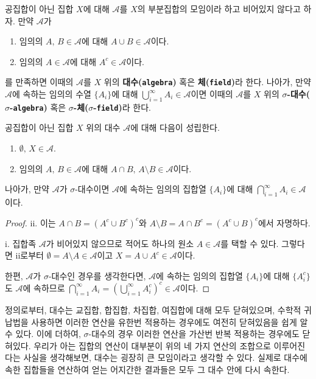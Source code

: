 \begin{definition}\label{def:algebra}
    공집합이 아닌 집합 $X$에 대해 $\mathcal{A}$를 $X$의 부분집합의 모임이라 하고 비어있지 않다고 하자. 만약 $\mathcal{A}$가
    \begin{enumerate}
        \item 임의의 $A,\,B\in\mathcal{A}$에 대해 $A\cup B\in\mathcal{A}$이다.
        \item 임의의 $A\in\mathcal{A}$에 대해 $A^c\in\mathcal{A}$이다.
    \end{enumerate}
    를 만족하면 이때의 $\mathcal{A}$를 $X$ 위의 \textbf{대수(\texttt{algebra})} 혹은 \textbf{체(\texttt{field})}라 한다. 나아가, 만약 $\mathcal{A}$에 속하는 임의의 수열 $\{A_i\}$에 대해 $\bigcup_{i=1}^\infty A_i\in\mathcal{A}$이면 이때의 $\mathcal{A}$를 $X$ 위의 \textbf{$\sigma$-대수($\sigma$-\texttt{algebra})} 혹은 \textbf{$\sigma$-체($\sigma$-\texttt{field})}라 한다.
\end{definition}

\begin{proposition}
    공집합이 아닌 집합 $X$ 위의 대수 $\mathcal{A}$에 대해 다음이 성립한다.
    \begin{enumerate}
        \item $\emptyset,\,X\in\mathcal{A}$.
        \item 임의의 $A,\,B\in\mathcal{A}$에 대해 $A\cap B,\,A\setminus B\in\mathcal{A}$이다.
    \end{enumerate}
    나아가, 만약 $\mathcal{A}$가 $\sigma$-대수이면 $\mathcal{A}$에 속하는 임의의 집합열 $\{A_i\}$에 대해 $\bigcap_{i=1}^\infty A_i\in\mathcal{A}$이다.
\end{proposition}

\begin{proof}
    ii. 이는 $A\cap B=(A^c\cup B^c)^c$와 $A\setminus B=A\cap B^c=(A^c\cup B)^c$에서 자명하다.

    i. 집합족 $\mathcal{A}$가 비어있지 않으므로 적어도 하나의 원소 $A\in\mathcal{A}$를 택할 수 있다. 그렇다면 ii로부터 $\emptyset=A\setminus A\in\mathcal{A}$이고 $X=A\cup A^c\in\mathcal{A}$이다.

    한편, $\mathcal{A}$가 $\sigma$-대수인 경우를 생각한다면, $\mathcal{A}$에 속하는 임의의 집합열 $\{A_i\}$에 대해 $\{A_i^c\}$도 $\mathcal{A}$에 속하므로 $\bigcap_{i=1}^\infty A_i=(\bigcup_{i=1}^\infty A_i^c)^c\in\mathcal{A}$이다.
\end{proof}

정의로부터, 대수는 교집합, 합집합, 차집합, 여집합에 대해 모두 닫혀있으며, 수학적 귀납법을 사용하면 이러한 연산을 유한번 적용하는 경우에도 여전히 닫혀있음을 쉽게 알 수 있다. 이에 더하여, $\sigma$-대수의 경우 이러한 연산을 가산번 반복 적용하는 경우에도 닫혀있다. 우리가 아는 집합의 연산이 대부분이 위의 네 가지 연산의 조합으로 이루어진다는 사실을 생각해보면, 대수는 굉장히 큰 모임이라고 생각할 수 있다. 실제로 대수에 속한 집합들을 연산하여 얻는 어지간한 결과들은 모두 그 대수 안에 다시 속한다.

